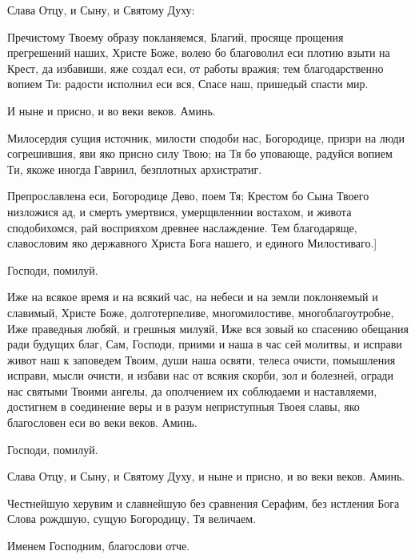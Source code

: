 \begin{mymulticols}
Слава Отцу, и Сыну, и Святому Духу: 



Пречистому Твоему образу покланяемся, Благий, просяще прощения прегрешений наших, Христе Боже, волею бо благоволил еси плотию взыти на Крест, да избавиши, яже создал еси, от работы вражия; тем благодарственно вопием Ти: радости исполнил еси вся, Спасе наш, пришедый спасти мир.



И ныне и присно, и во веки веков. Аминь.


Милосердия сущия источник, милости сподоби нас, Богородице, призри на люди согрешившия, яви яко присно силу Твою; на Тя бо уповающе, радуйся вопием Ти, якоже иногда Гавриил, безплотных архистратиг.


Препрославлена еси, Богородице Дево, поем Тя; Крестом бо Сына Твоего низложися ад, и смерть умертвися, умерщвленнии востахом, и живота сподобихомся, рай восприяхом древнее наслаждение. Тем благодаряще, славословим яко державного Христа Бога нашего, и единого Милостиваго.]





Господи, помилуй. 

Иже на всякое время и на всякий час, на небеси и на земли поклоняемый и славимый, Христе Боже, долготерпеливе, многомилостиве, многоблагоутробне, Иже праведныя любяй, и грешныя милуяй, Иже вся зовый ко спасению обещания ради будущих благ, Сам, Господи, приими и наша в час сей молитвы, и исправи живот наш к заповедем Твоим, души наша освяти, телеса очисти, помышления исправи, мысли очисти, и избави нас от всякия скорби, зол и болезней, огради нас святыми Твоими ангелы, да ополчением их соблюдаеми и наставляеми, достигнем в соединение веры и в разум неприступныя Твоея славы, яко благословен еси во веки веков. Аминь.





Господи, помилуй. 

Слава Отцу, и Сыну, и Святому Духу, и ныне и присно, и во веки веков. Аминь.

Честнейшую херувим и славнейшую без сравнения Серафим, без истления Бога Слова рождшую, сущую Богородицу, Тя величаем.

Именем Господним, благослови отче.


\end{mymulticols}
